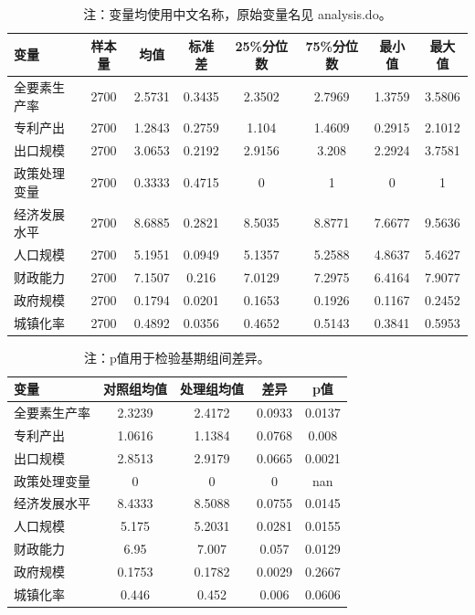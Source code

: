 \documentclass[12pt,a4paper]{article}
\begin{document}
\begin{table}[!htbp]
\centering
\caption{主要变量描述性统计}
\setlength{\tabcolsep}{4pt}
\begin{tabular*}{\textwidth}{@{\extracolsep{\fill}}lccccccc}
\toprule
变量 & 样本量 & 均值 & 标准差 & 25\%分位数 & 75\%分位数 & 最小值 & 最大值 \\
\midrule
全要素生产率 & 2700 & 2.5731 & 0.3435 & 2.3502 & 2.7969 & 1.3759 & 3.5806 \\
专利产出 & 2700 & 1.2843 & 0.2759 & 1.104 & 1.4609 & 0.2915 & 2.1012 \\
出口规模 & 2700 & 3.0653 & 0.2192 & 2.9156 & 3.208 & 2.2924 & 3.7581 \\
政策处理变量 & 2700 & 0.3333 & 0.4715 & 0 & 1 & 0 & 1 \\
经济发展水平 & 2700 & 8.6885 & 0.2821 & 8.5035 & 8.8771 & 7.6677 & 9.5636 \\
人口规模 & 2700 & 5.1951 & 0.0949 & 5.1357 & 5.2588 & 4.8637 & 5.4627 \\
财政能力 & 2700 & 7.1507 & 0.216 & 7.0129 & 7.2975 & 6.4164 & 7.9077 \\
政府规模 & 2700 & 0.1794 & 0.0201 & 0.1653 & 0.1926 & 0.1167 & 0.2452 \\
城镇化率 & 2700 & 0.4892 & 0.0356 & 0.4652 & 0.5143 & 0.3841 & 0.5953 \\
\bottomrule
\end{tabular*}
\caption*{\footnotesize 注：变量均使用中文名称，原始变量名见 analysis.do。}
\end{table}

\begin{table}[!htbp]
\centering
\caption{处理组与对照组基期平衡性}
\setlength{\tabcolsep}{4pt}
\begin{tabular*}{\textwidth}{@{\extracolsep{\fill}}lcccc}
\toprule
变量 & 对照组均值 & 处理组均值 & 差异 & p值 \\
\midrule
全要素生产率 & 2.3239 & 2.4172 & 0.0933 & 0.0137 \\
专利产出 & 1.0616 & 1.1384 & 0.0768 & 0.008 \\
出口规模 & 2.8513 & 2.9179 & 0.0665 & 0.0021 \\
政策处理变量 & 0 & 0 & 0 & nan \\
经济发展水平 & 8.4333 & 8.5088 & 0.0755 & 0.0145 \\
人口规模 & 5.175 & 5.2031 & 0.0281 & 0.0155 \\
财政能力 & 6.95 & 7.007 & 0.057 & 0.0129 \\
政府规模 & 0.1753 & 0.1782 & 0.0029 & 0.2667 \\
城镇化率 & 0.446 & 0.452 & 0.006 & 0.0606 \\
\bottomrule
\end{tabular*}
\caption*{\footnotesize 注：p值用于检验基期组间差异。}
\end{table}
\end{document}
